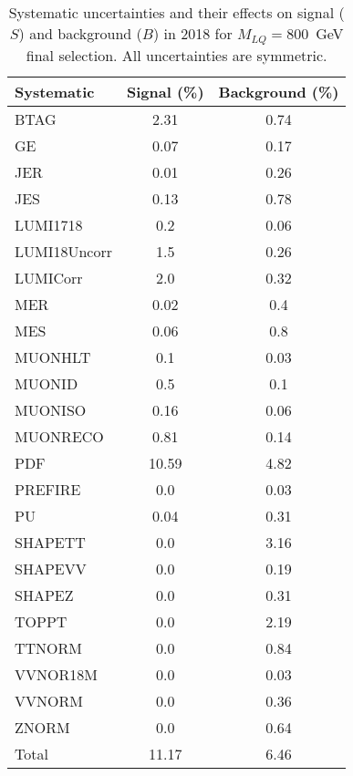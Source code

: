 \begin{table}[htbp]
\begin{center}
\caption{Systematic uncertainties and their effects on signal ($S$) and background ($B$) in 2018 for $M_{LQ}=800$~GeV final selection. All uncertainties are symmetric.}
\begin{tabular}{lcc}
\hline\hline
Systematic & Signal (\%) & Background (\%) \\ \hline 
BTAG & 2.31 & 0.74\\ 
GE & 0.07 & 0.17\\ 
JER & 0.01 & 0.26\\ 
JES & 0.13 & 0.78\\ 
LUMI1718 & 0.2 & 0.06\\ 
LUMI18Uncorr & 1.5 & 0.26\\ 
LUMICorr & 2.0 & 0.32\\ 
MER & 0.02 & 0.4\\ 
MES & 0.06 & 0.8\\ 
MUONHLT & 0.1 & 0.03\\ 
MUONID & 0.5 & 0.1\\ 
MUONISO & 0.16 & 0.06\\ 
MUONRECO & 0.81 & 0.14\\ 
PDF & 10.59 & 4.82\\ 
PREFIRE & 0.0 & 0.03\\ 
PU & 0.04 & 0.31\\ 
SHAPETT & 0.0 & 3.16\\ 
SHAPEVV & 0.0 & 0.19\\ 
SHAPEZ & 0.0 & 0.31\\ 
TOPPT & 0.0 & 2.19\\ 
TTNORM & 0.0 & 0.84\\ 
VVNOR18M & 0.0 & 0.03\\ 
VVNORM & 0.0 & 0.36\\ 
ZNORM & 0.0 & 0.64\\ 
Total & 11.17 & 6.46\\ \hline \hline
\end{tabular}
\label{tab:SysUncertainties_uujj_800}
\end{center}
\end{table}

